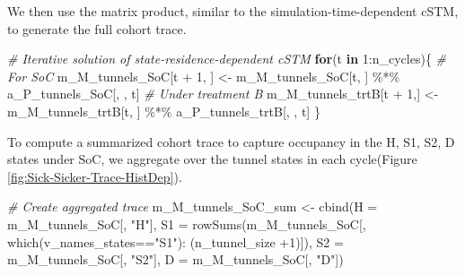 \documentclass[
]{article}
\newenvironment{Shaded}{\begin{snugshade}}{\end{snugshade}}
\newcommand{\AttributeTok}[1]{\textcolor[rgb]{0.77,0.63,0.00}{#1}}
\newcommand{\CommentTok}[1]{\textcolor[rgb]{0.56,0.35,0.01}{\textit{#1}}}
\newcommand{\ControlFlowTok}[1]{\textcolor[rgb]{0.13,0.29,0.53}{\textbf{#1}}}
\newcommand{\DecValTok}[1]{\textcolor[rgb]{0.00,0.00,0.81}{#1}}
\newcommand{\FunctionTok}[1]{\textcolor[rgb]{0.00,0.00,0.00}{#1}}
\newcommand{\NormalTok}[1]{#1}
\newcommand{\OtherTok}[1]{\textcolor[rgb]{0.56,0.35,0.01}{#1}}
\newcommand{\SpecialCharTok}[1]{\textcolor[rgb]{0.00,0.00,0.00}{#1}}
\newcommand{\StringTok}[1]{\textcolor[rgb]{0.31,0.60,0.02}{#1}}
\begin{document}
We then use the matrix product, similar to the simulation-time-dependent cSTM, to generate the full cohort trace.

\begin{Shaded}
\begin{Highlighting}[]
\CommentTok{\# Iterative solution of state{-}residence{-}dependent cSTM}
\ControlFlowTok{for}\NormalTok{(t }\ControlFlowTok{in} \DecValTok{1}\SpecialCharTok{:}\NormalTok{n\_cycles)\{}
  \CommentTok{\# For SoC}
\NormalTok{  m\_M\_tunnels\_SoC[t }\SpecialCharTok{+} \DecValTok{1}\NormalTok{, ] }\OtherTok{\textless{}{-}}\NormalTok{ m\_M\_tunnels\_SoC[t, ] }\SpecialCharTok{\%*\%}\NormalTok{ a\_P\_tunnels\_SoC[, , t]}
  \CommentTok{\# Under treatment B}
\NormalTok{  m\_M\_tunnels\_trtB[t }\SpecialCharTok{+} \DecValTok{1}\NormalTok{,] }\OtherTok{\textless{}{-}}\NormalTok{ m\_M\_tunnels\_trtB[t, ] }\SpecialCharTok{\%*\%}\NormalTok{ a\_P\_tunnels\_trtB[, , t]}
\NormalTok{\}}
\end{Highlighting}
\end{Shaded}

To compute a summarized cohort trace to capture occupancy in the H, S1, S2, D states under SoC, we aggregate over the tunnel states in each cycle(Figure \ref{fig:Sick-Sicker-Trace-HistDep}).

\begin{Shaded}
\begin{Highlighting}[]
\CommentTok{\# Create aggregated trace}
\NormalTok{m\_M\_tunnels\_SoC\_sum }\OtherTok{\textless{}{-}} \FunctionTok{cbind}\NormalTok{(}\AttributeTok{H =}\NormalTok{ m\_M\_tunnels\_SoC[, }\StringTok{"H"}\NormalTok{], }
                             \AttributeTok{S1 =} \FunctionTok{rowSums}\NormalTok{(m\_M\_tunnels\_SoC[, }\FunctionTok{which}\NormalTok{(v\_names\_states}\SpecialCharTok{==}\StringTok{"S1"}\NormalTok{)}\SpecialCharTok{:}
\NormalTok{                                                        (n\_tunnel\_size }\SpecialCharTok{+}\DecValTok{1}\NormalTok{)]), }
                             \AttributeTok{S2 =}\NormalTok{ m\_M\_tunnels\_SoC[, }\StringTok{"S2"}\NormalTok{],}
                             \AttributeTok{D =}\NormalTok{ m\_M\_tunnels\_SoC[, }\StringTok{"D"}\NormalTok{])}
\end{Highlighting}
\end{Shaded}
\end{document}
